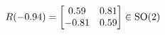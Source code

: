 \documentclass[preview]{standalone}
\begin{document}
\begin{align*}
\special{dvisvgm:raw <g id='unique000'>}R(-0.94) = \begin{bmatrix} 0.59 & 0.81 \\ -0.81 & 0.59 \end{bmatrix} \in \text{SO}(2)\special{dvisvgm:raw </g>}
\end{align*}
\end{document}

